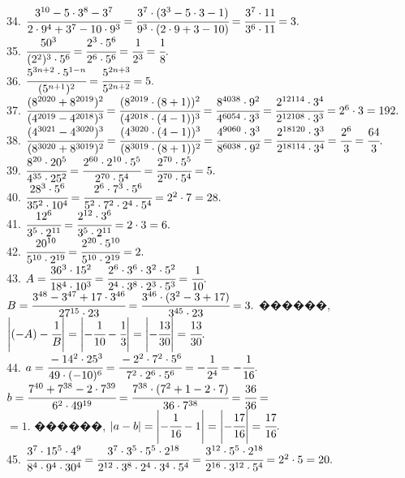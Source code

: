 \documentclass[12pt]{article}
\begin{document}
34. $\cfrac{3^{10}-5\cdot3^8-3^7}{2\cdot9^4+3^7-10\cdot9^3}=\cfrac{3^7\cdot(3^3-5\cdot3-1)}{9^3\cdot(2\cdot9+3-10)}=
\cfrac{3^7\cdot11}{3^6\cdot11}=3.$\\
35. $\cfrac{50^3}{(2^2)^3\cdot5^6}=\cfrac{2^3\cdot5^6}{2^6\cdot5^6}=\cfrac{1}{2^3}=\cfrac{1}{8}.$\\
36. $\cfrac{5^{3n+2}\cdot5^{1-n}}{(5^{n+1})^2}=\cfrac{5^{2n+3}}{5^{2n+2}}=5.$\\
37. $\cfrac{(8^{2020}+8^{2019})^2}{(4^{2019}-4^{2018})^3}=\cfrac{(8^{2019}\cdot(8+1))^2}{(4^{2018}\cdot(4-1))^3}=
\cfrac{8^{4038}\cdot9^2}{4^{6054}\cdot3^3}=\cfrac{2^{12114}\cdot3^4}{2^{12108}\cdot3^3}=2^6\cdot3=192.$\\
38. $\cfrac{(4^{3021}-4^{3020})^3}{(8^{3020}+8^{3019})^2}=\cfrac{(4^{3020}\cdot(4-1))^3}{(8^{3019}\cdot(8+1))^2}=
\cfrac{4^{9060}\cdot3^3}{8^{6038}\cdot9^2}=\cfrac{2^{18120}\cdot3^3}{2^{18114}\cdot3^4}=\cfrac{2^6}{3}=\cfrac{64}{3}.$\\
39. $\cfrac{8^{20}\cdot20^5}{4^{35}\cdot25^2}=\cfrac{2^{60}\cdot2^{10}\cdot5^5}{2^{70}\cdot5^4}=
\cfrac{2^{70}\cdot5^5}{2^{70}\cdot5^4}=5.$\\
40. $\cfrac{28^3\cdot5^6}{35^2\cdot10^4}=\cfrac{2^6\cdot7^3\cdot5^6}{5^2\cdot7^2\cdot2^4\cdot5^4}=2^2\cdot7=28.$\\
41. $\cfrac{12^6}{3^5\cdot2^{11}}=\cfrac{2^{12}\cdot3^6}{3^5\cdot2^{11}}=2\cdot3=6.$\\
42. $\cfrac{20^{10}}{5^{10}\cdot2^{19}}=\cfrac{2^{20}\cdot5^{10}}{5^{10}\cdot2^{19}}=2.$\\
43. $A=\cfrac{36^3\cdot15^2}{18^4\cdot10^3}=\cfrac{2^6\cdot3^6\cdot3^2\cdot5^2}{2^4\cdot3^8\cdot2^3\cdot5^3}=\cfrac{1}{10}.$
$B=\cfrac{3^{48}-3^{47}+17\cdot3^{46}}{27^{15}\cdot23}=\cfrac{3^{46}\cdot(3^2-3+17)}{3^{45}\cdot23}=3.$ ������, $\left|(-A)-\cfrac{1}{B}\right|=
\left|-\cfrac{1}{10}-\cfrac{1}{3}\right|=\left|-\cfrac{13}{30}\right|=\cfrac{13}{30}.$\\
44. $a=\cfrac{-14^2\cdot25^3}{49\cdot(-10)^6}=\cfrac{-2^2\cdot7^2\cdot5^6}{7^2\cdot2^6\cdot5^6}=-\cfrac{1}{2^4}=-\cfrac{1}{16}.$
$b=\cfrac{7^{40}+7^{38}-2\cdot7^{39}}{6^2\cdot49^{19}}=\cfrac{7^{38}\cdot(7^2+1-2\cdot7)}{36\cdot7^{38}}=
\cfrac{36}{36}=$\\$=1.$ ������, $|a-b|=\left|-\cfrac{1}{16}-1\right|=\left|-\cfrac{17}{16}\right|=\cfrac{17}{16}.$\\
45. $\cfrac{3^7\cdot15^5\cdot4^9}{8^4\cdot9^4\cdot30^4}=\cfrac{3^7\cdot3^5\cdot5^5\cdot2^{18}}{2^{12}\cdot3^8\cdot2^4\cdot3^4\cdot5^4}=
\cfrac{3^{12}\cdot5^5\cdot2^{18}}{2^{16}\cdot3^{12}\cdot5^4}=2^2\cdot5=20.$\\
\end{document}
